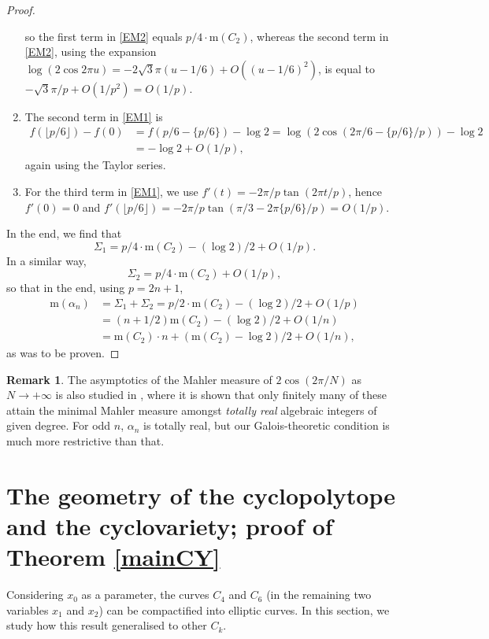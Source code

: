 \documentclass[12pt,reqno]{amsart}
\theoremstyle{definition}
\theoremstyle{plain}
\theoremstyle{definition}
\newtheorem{remark}[theorem]{Remark}
\newcommand\m{\mathrm{m}}
\begin{document}
\begin{proof}
\begin{enumerate}
 so the first term in \eqref{EM2} equals $p/4 \cdot \m(C_2)$, whereas the second term in \eqref{EM2}, using the expansion $ \log(2 \cos 2 \pi u) = - 2 \sqrt{3} \pi (u-1/6) +O((u-1/6)^2)$, is equal to $-\sqrt{3} \pi / p + O(1/p^2) = O(1/p)$. 
\item The second term in \eqref{EM1} is \begin{align*} f(\lfloor p/6 \rfloor) -f(0) & = f(p/6-\{p/6\}) - \log 2= \log ( 2 \cos ( 2 \pi/6 - \{p/6\}/p)) - \log 2 \\ &= - \log 2 + O(1/p), \end{align*} again using the Taylor series. 
\item For the third term in \eqref{EM1}, we use $f'(t) = - 2 \pi/p \tan (2 \pi t/p)$, hence $f'(0)=0$ and $f'(\lfloor p/6 \rfloor)= -2 \pi/p \tan(\pi/3-2 \pi \{p/6\}/p) = O(1/p)$.
\end{enumerate} 
In the end, we find that 
$$\Sigma_1 = p/4 \cdot \m(C_2) - (\log 2)/2 + O(1/p).$$ 
In a similar way, 
$$ \Sigma_2 = p/4 \cdot \m(C_2) + O(1/p),$$
so that in the end, using $p=2n+1$, 
\begin{align*} 
\m(\alpha_n) &=  \Sigma_1 + \Sigma_2 = p/2 \cdot \m(C_2) - (\log 2)/2 + O(1/p) \\ & = (n+1/2) \m(C_2) -( \log 2)/2 + O(1/n)\\ &= \m(C_2) \cdot n + (\m(C_2)-\log 2)/2 + O(1/n), 
\end{align*}
as was to be proven. 
\end{proof} 
  
\begin{remark}   
The asymptotics of the Mahler measure of $2 \cos(2\pi/N)$ as $N \rightarrow + \infty$ is also studied in \cite[\S 6]{SmythTR}, where it is shown that only finitely many of these attain the minimal Mahler measure amongst \emph{totally real} algebraic integers of given degree. For odd $n$, $\alpha_n$ is totally real, but our Galois-theoretic condition is much more restrictive than that. 
\end{remark} 



\section{The geometry of the cyclopolytope and the cyclovariety;  proof of Theorem \ref{mainCY}} 
\label{sec:geometry of the cyclovariety} \label{NP}

Considering $x_0$ as a parameter, the curves $C_4$ and $C_6$ (in the remaining two variables $x_1$ and $x_2$) can be compactified into elliptic curves. In this section, we study how this result generalised to other $C_k$. 
\end{document}
